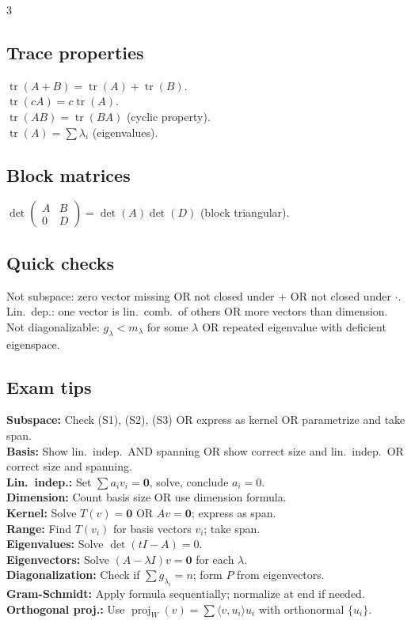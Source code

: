 \documentclass[10pt]{article}
\newcommand{\tr}{\operatorname{tr}}
\newcommand{\proj}{\operatorname{proj}}
\begin{document}
\begin{multicols}{3}
\subsection*{Trace properties}
$\tr(A+B)=\tr(A)+\tr(B)$.\\
$\tr(cA)=c\tr(A)$.\\
$\tr(AB)=\tr(BA)$ (cyclic property).\\
$\tr(A)=\sum\lambda_i$ (eigenvalues).

\subsection*{Block matrices}
$\det\begin{pmatrix}A&B\\0&D\end{pmatrix}=\det(A)\det(D)$ (block triangular).

\subsection*{Quick checks}
Not subspace: zero vector missing OR not closed under $+$ OR not closed under $\cdot$.\\
Lin.\ dep.: one vector is lin.\ comb.\ of others OR more vectors than dimension.\\
Not diagonalizable: $g_\lambda<m_\lambda$ for some $\lambda$ OR repeated eigenvalue with deficient eigenspace.

\subsection*{Exam tips}
\textbf{Subspace:} Check (S1), (S2), (S3) OR express as kernel OR parametrize and take span.\\
\textbf{Basis:} Show lin.\ indep.\ AND spanning OR show correct size and lin.\ indep.\ OR correct size and spanning.\\
\textbf{Lin.\ indep.:} Set $\sum a_iv_i=\bm{0}$, solve, conclude $a_i=0$.\\
\textbf{Dimension:} Count basis size OR use dimension formula.\\
\textbf{Kernel:} Solve $T(v)=\bm{0}$ OR $Av=\bm{0}$; express as span.\\
\textbf{Range:} Find $T(v_i)$ for basis vectors $v_i$; take span.\\
\textbf{Eigenvalues:} Solve $\det(tI-A)=0$.\\
\textbf{Eigenvectors:} Solve $(A-\lambda I)v=\bm{0}$ for each $\lambda$.\\
\textbf{Diagonalization:} Check if $\sum g_{\lambda_i}=n$; form $P$ from eigenvectors.\\
\textbf{Gram-Schmidt:} Apply formula sequentially; normalize at end if needed.\\
\textbf{Orthogonal proj.:} Use $\proj_W(v)=\sum\langle v,u_i\rangle u_i$ with orthonormal $\{u_i\}$.

\end{multicols}
\end{document}
